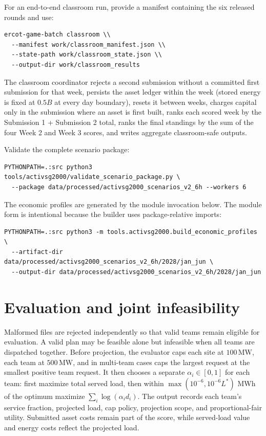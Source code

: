 \documentclass[12pt]{article}
\newcommand{\MW}{\,\mathrm{MW}}
\begin{document}
For an end-to-end classroom run, provide a manifest containing the six released
rounds and use:
\begin{lstlisting}
ercot-game-batch classroom \\
  --manifest work/classroom_manifest.json \\
  --state-path work/classroom_state.json \\
  --output-dir work/classroom_results
\end{lstlisting}

The classroom coordinator rejects a second submission without a committed first
submission for that week, persists the asset ledger within the week (stored
energy is fixed at $0.5B$ at every day boundary), resets it between weeks, charges capital only in the submission where an
asset is first built, ranks each scored week by the Submission 1 + Submission 2
total, ranks the final standings by the sum of the four Week 2 and Week 3
scores, and writes aggregate classroom-safe outputs.

Validate the complete scenario package:
\begin{lstlisting}
PYTHONPATH=.:src python3 tools/activsg2000/validate_scenario_package.py \
  --package data/processed/activsg2000_scenarios_v2_6h --workers 6
\end{lstlisting}

The economic profiles are generated by the module invocation below. The
module form is intentional because the builder uses package-relative imports:
\begin{lstlisting}
PYTHONPATH=.:src python3 -m tools.activsg2000.build_economic_profiles \
  --artifact-dir data/processed/activsg2000_scenarios_v2_6h/2028/jan_jun \
  --output-dir data/processed/activsg2000_scenarios_v2_6h/2028/jan_jun
\end{lstlisting}

\section{Evaluation and joint infeasibility}

Malformed files are rejected independently so that valid teams remain eligible
for evaluation. A valid plan may be feasible alone but infeasible when all
teams are dispatched together. Before projection, the evaluator caps each site
at $100\MW$, each team at $500\MW$, and in multi-team cases caps the largest
request at the smallest positive team request. It then chooses a separate
$\alpha_i\in[0,1]$ for each team: first maximize total served load, then within
$\max(10^{-6},10^{-6}L^*)$ MWh of the optimum maximize
$\sum_i\log(\alpha_i d_i)$. The output records each team's service fraction,
projected load, cap policy, projection scope, and proportional-fair utility.
Submitted asset costs remain part of the score, while served-load value and
energy costs reflect the projected load.
\end{document}
